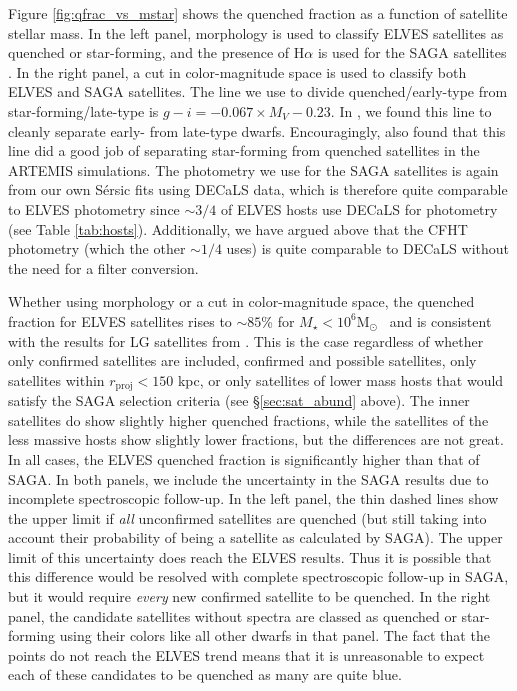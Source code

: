 \documentclass[twocolumn]{aastex62}
\newcommand{\msun}{M$_\odot$}
\begin{document}
Figure \ref{fig:qfrac_vs_mstar} shows the quenched fraction as a function of satellite stellar mass. In the left panel, morphology is used to classify ELVES satellites as quenched or star-forming, and the presence of H$\alpha$ is used for the SAGA satellites \citep{mao2020}. In the right panel, a cut in color-magnitude space is used to classify both ELVES and SAGA satellites. The line we use to divide quenched/early-type from star-forming/late-type is $g-i=-0.067\times M_V - 0.23$. In \citet{carlsten2021a}, we found this line to cleanly separate early- from late-type dwarfs. Encouragingly, \citet{font2021b} also found that this line did a good job of separating star-forming from quenched satellites in the ARTEMIS simulations. The photometry we use for the SAGA satellites is again from our own S\'{e}rsic fits using DECaLS data, which is therefore quite comparable to ELVES photometry since $\sim3/4$ of ELVES hosts use DECaLS for photometry (see Table \ref{tab:hosts}). Additionally, we have argued above that the CFHT photometry (which the other $\sim1/4$ uses) is quite comparable to DECaLS without the need for a filter conversion.








Whether using morphology or a cut in color-magnitude space, the quenched fraction for ELVES satellites rises to $\sim85$\% for $M_\star < 10^6$\msun~ and is consistent with the results for LG satellites from \citet{wetzel2015}. This is the case regardless of whether only confirmed satellites are included, confirmed and possible satellites, only satellites within $r_\mathrm{proj}<150$ kpc, or only satellites of lower mass hosts that would satisfy the SAGA selection criteria (see \S\ref{sec:sat_abund} above). The inner satellites do show slightly higher quenched fractions, while the satellites of the less massive hosts show slightly lower fractions, but the differences are not great. In all cases, the ELVES quenched fraction is significantly higher than that of SAGA. In both panels, we include the uncertainty in the SAGA results due to incomplete spectroscopic follow-up. In the left panel, the thin dashed lines show the upper limit if \textit{all} unconfirmed satellites are quenched (but still taking into account their probability of being a satellite as calculated by SAGA). The upper limit of this uncertainty does reach the ELVES results. Thus it is possible that this difference would be resolved with complete spectroscopic follow-up in SAGA, but it would require \textit{every} new confirmed satellite to be quenched. In the right panel, the candidate satellites without spectra are classed as quenched or star-forming using their colors like all other dwarfs in that panel. The fact that the points do not reach the ELVES trend means that it is unreasonable to expect each of these candidates to be quenched as many are quite blue.
\end{document}
